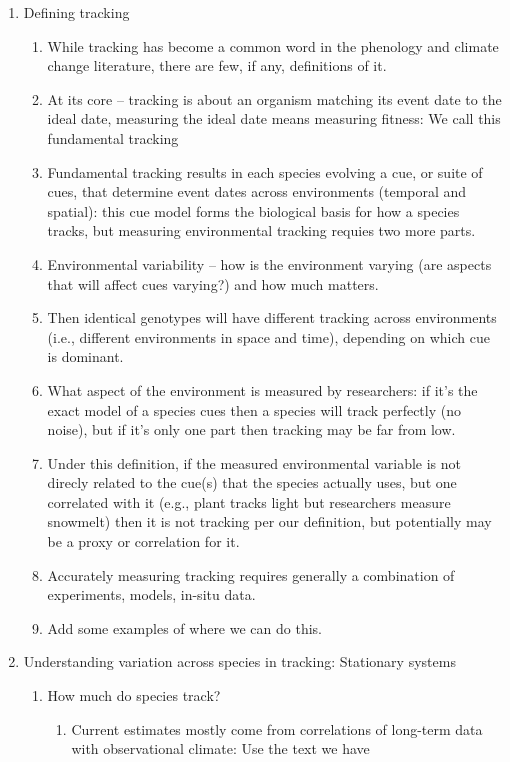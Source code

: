 \documentclass[11pt,letterpaper]{article}
\begin{document}
\begin{enumerate}
\item Defining tracking %
\begin{enumerate}
\item While tracking has become a common word in the phenology and climate change literature, there are few, if any, definitions of it.
\item At its core -- tracking is about an organism matching its event date to the ideal date, measuring the ideal date means measuring fitness: We call this fundamental tracking
\item Fundamental tracking results in each species evolving a cue, or suite of cues, that determine event dates across environments (temporal and spatial): this cue model forms the biological basis for how a species tracks, but measuring environmental tracking requies two more parts.
\item Environmental variability -- how is the environment varying (are aspects that will affect cues varying?) and how much matters.
\item Then identical genotypes will have different tracking across environments (i.e., different environments in space and time), depending on which cue is dominant. 
\item What aspect of the environment is measured by researchers: if it's the exact model of a species cues then a species will track perfectly (no noise), but if it's only one part then tracking may be far from low. 
\item Under this definition, if the measured environmental variable is not direcly related to the cue(s) that the species actually uses, but one correlated with it (e.g., plant tracks light but researchers measure snowmelt) then it is not tracking per our definition, but potentially may be a proxy or correlation for it. 
\item Accurately measuring tracking requires generally a combination of experiments, models, in-situ data. 
\item Add some examples of where we can do this.
\end{enumerate}
\item Understanding variation across species in tracking: Stationary systems
\begin{enumerate}
\item How much do species track? 
\begin{enumerate}
\item Current estimates mostly come from correlations of long-term data with observational climate: Use the text we have 

\end{enumerate}
\end{enumerate}
\end{enumerate}
\end{document}
